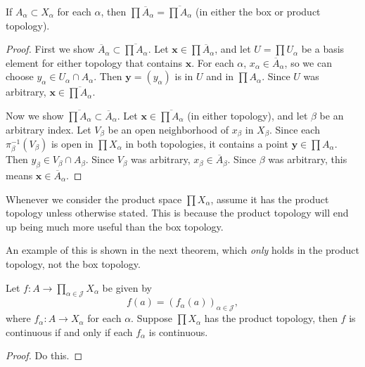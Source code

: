 \documentclass[10pt]{report}
\begin{document}
\begin{prop}
	If $A_{\alpha}\subset X_{\alpha}$ for each $\alpha$, then $\prod \overline{A}_{\alpha} = \overline{\prod A_{\alpha}} $ (in either the box or product topology).
\end{prop}
\begin{proof}
	First we show $\overline{A}_{\alpha} \subset \overline{\prod A_{\alpha}}$. Let $\mathbf{x} \in \prod \overline{A}_{\alpha}$, and let $U = \prod U_{\alpha}$ be a basis element for either topology that contains $\mathbf{x}$. For each $\alpha$, $x_{\alpha}\in \overline{A}_{\alpha}$, so we can choose $y_{\alpha}\in U_{\alpha}\cap A_{\alpha}$. Then $\mathbf{y} = (y_{\alpha})$ is in $U$ and in $\prod A_{\alpha}$. Since $U$ was arbitrary, $\mathbf{x} \in \overline{\prod A_{\alpha}} $.

	Now we show $\overline{\prod A_{\alpha}} \subset \overline{A}_{\alpha}$. Let $\mathbf{x} \in \overline{\prod A_{\alpha}}$ (in either topology), and let $\beta$ be an arbitrary index. Let $V_{\beta}$ be an open neighborhood of $x_{\beta}$ in $X_{\beta}$. Since each $\pi_{\beta}^{-1}(V_{\beta})$ is open in $\prod X_{\alpha}$ in both topologies, it contains a point $\mathbf{y} \in \prod A_{\alpha}$. Then $y_{\beta}\in V_\beta \cap A_{\beta}$. Since $V_{\beta}$ was arbitrary, $x_{\beta} \in \overline{A}_{\beta}$. Since $\beta$ was arbitrary, this means $\mathbf{x} \in \overline{A}_{\alpha}$.
\end{proof}

\begin{note}{}{}
Whenever we consider the product space $\prod X_{\alpha}$, assume it has the product topology unless otherwise stated. This is because the product topology will end up being much more useful than the box topology.

An example of this is shown in the next theorem, which \textit{only} holds in the product topology, not the box topology.
\end{note}

\begin{thrm}{}{}
	Let $f:A\to \prod_{\alpha\in\mathcal{J}}X_{\alpha}$ be given by \[f(a) = (f_{\alpha}(a))_{\alpha \in \mathcal{J}},\] where $f_{\alpha}:A\to X_{\alpha}$ for each $\alpha$. Suppose $\prod X_{\alpha}$ has the product topology, then $f$ is continuous if and only if each $f_{\alpha}$ is continuous.
\end{thrm}
\begin{proof}
{\color{red}Do this.}
\end{proof}
\end{document}
